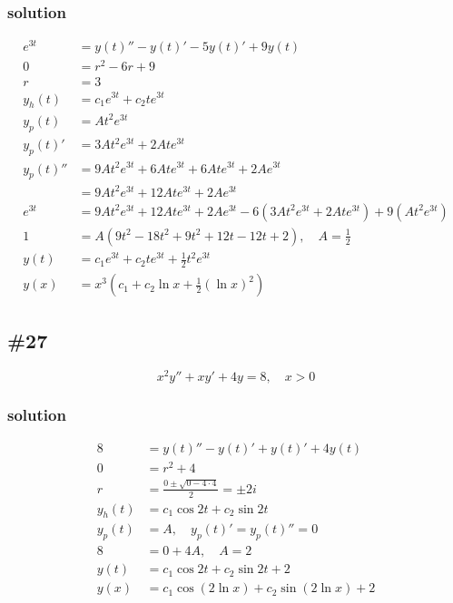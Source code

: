 \documentclass{article}
\begin{document}
\subsubsection*{solution}
\begin{align*}
	e^{3t}&=y(t)''-y(t)'-5y(t)'+9y(t)\\
	0&=r^2-6r+9\\
	r&=3\\
	y_h(t)&=c_1e^{3t}+c_2te^{3t}\\
	y_p(t)&=At^2e^{3t}\\
	y_p(t)'&=3At^2e^{3t}+2Ate^{3t}\\
	y_p(t)''&=9At^2e^{3t}+6Ate^{3t}+6Ate^{3t}+2Ae^{3t}\\
	&=9At^2e^{3t}+12Ate^{3t}+2Ae^{3t}\\
	e^{3t}&=9At^2e^{3t}+12Ate^{3t}+2Ae^{3t}-6\left(3At^2e^{3t}+2Ate^{3t}\right)+9\left(At^2e^{3t}\right)\\
	1&=A\left(9t^2-18t^2+9t^2+12t-12t+2\right),\quad A=\frac{1}{2}\\
	y(t)&=c_1e^{3t}+c_2te^{3t}+\frac{1}{2}t^2e^{3t}\\
	y(x)&=x^3\left(c_1+c_2\ln x+\frac{1}{2}(\ln{x})^2\right)
\end{align*}

\subsection*{\#27}
\[x^2y''+xy'+4y=8,\quad x>0\]
\subsubsection*{solution}
\begin{align*}
	8&=y(t)''-y(t)'+y(t)'+4y(t)\\
	0&=r^2+4\\
	r&=\frac{0\pm\sqrt{0-4\cdot4}}{2}=\pm2i\\
	y_h(t)&=c_1\cos 2t+c_2\sin 2t\\
	y_p(t)&=A,\quad y_p(t)'=y_p(t)''=0\\
	8&=0+4A,\quad A=2\\
	y(t)&=c_1\cos 2t+c_2\sin 2t+2\\
	y(x)&=c_1\cos(2\ln x)+c_2\sin(2\ln x)+2
\end{align*}
\end{document}
